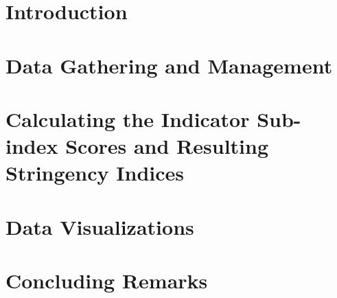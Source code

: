 \documentclass[11pt, a4paper, leqno]{article}
\begin{document}
\tableofcontents
\clearpage

\listoffigures
\clearpage


\section*{Introduction} %
\label{sec:introduction}




\section{Data Gathering and Management} %
\label{sec:section1}




\section{Calculating the Indicator Sub-index Scores and Resulting Stringency Indices} %
\label{sec:section2}




\section{Data Visualizations} %
\label{sec:section3}




\section*{Concluding Remarks} %
\label{sec:conclusion}




\clearpage





\clearpage
\end{document}
